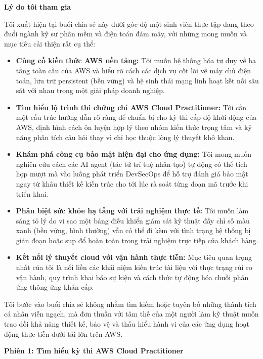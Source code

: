 \vspace{0.5em}\noindent\textbf{Lý do tôi tham gia}\par

Tôi xuất hiện tại buổi chia sẻ này dưới góc độ một sinh viên thực tập
đang theo đuổi ngành kỹ sư phần mềm và điện toán đám mây, với những mong
muốn và mục tiêu cải thiện rất cụ thể:

\begin{itemize}
\tightlist
\item
  \textbf{Củng cố kiến thức AWS nền tảng:} Tôi muốn hệ thống hóa tư duy
  về hạ tầng toàn cầu của AWS và hiểu rõ cách các dịch vụ cốt lõi về máy
  chủ điện toán, lưu trữ persistent (bền vững) và hệ sinh thái mạng linh
  hoạt kết nối sâu sát với nhau trong một giải pháp doanh nghiệp.
\item
  \textbf{Tìm hiểu lộ trình thi chứng chỉ AWS Cloud Practitioner:} Tôi
  cần một cấu trúc hướng dẫn rõ ràng để chuẩn bị cho kỳ thi cấp độ khởi
  động của AWS, định hình cách ôn luyện hợp lý theo nhóm kiến thức trọng
  tâm và kỹ năng phân tích câu hỏi thay vì chỉ học thuộc lòng lý thuyết
  khô khan.
\item
  \textbf{Khám phá công cụ bảo mật hiện đại cho ứng dụng:} Tôi mong muốn
  nghiên cứu cách các AI agent (tác tử trí tuệ nhân tạo) tự động có thể
  tích hợp mượt mà vào luồng phát triển DevSecOps để hỗ trợ đánh giá bảo
  mật ngay từ khâu thiết kế kiến trúc cho tới lúc rà soát từng đoạn mã
  trước khi triển khai.
\item
  \textbf{Phân biệt sức khỏe hạ tầng với trải nghiệm thực tế:} Tôi muốn
  làm sáng tỏ lý do vì sao một bảng điều khiển giám sát kỹ thuật đầy chỉ
  số màu xanh (bền vững, bình thường) vẫn có thể đi kèm với tình trạng
  hệ thống bị gián đoạn hoặc sụp đổ hoàn toàn trong trải nghiệm trực
  tiếp của khách hàng.
\item
  \textbf{Kết nối lý thuyết cloud với vận hành thực tiễn:} Mục tiêu quan
  trọng nhất của tôi là nối liền các khái niệm kiến trúc tài liệu với
  thực trạng rủi ro vận hành, quy trình khai báo sự kiện và cách thức tự
  động hóa chuỗi phản ứng thông ứng khẩn cấp.
\end{itemize}

Tôi bước vào buổi chia sẻ không nhằm tìm kiếm hoặc tuyên bố những thành
tích cá nhân viễn ngạch, mà đơn thuần với tâm thế của một người làm kỹ
thuật muốn trao dồi khả năng thiết kế, bảo vệ và thấu hiểu hành vi của
các ứng dụng hoạt động thực tiễn dưới tải lớn trên AWS.

\vspace{0.5em}\noindent\textbf{Phiên 1: Tìm hiểu kỳ thi AWS Cloud
Practitioner}\par

